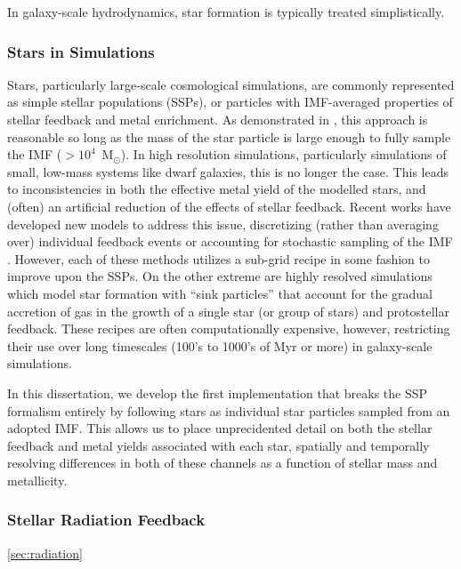 In galaxy-scale hydrodynamics, star formation is typically treated simplistically.


\subsubsection{Stars in Simulations}

Stars, particularly large-scale cosmological simulations, are commonly represented as simple stellar populations (SSPs), or particles with IMF-averaged properties of stellar feedback and metal enrichment. As demonstrated in \cite{Revaz2016}, this approach is reasonable so long as the mass of the star particle is large enough to fully sample the IMF ($> 10^{4}$~M$_{\odot}$). In high resolution simulations, particularly simulations of small, low-mass systems like dwarf galaxies, this is no longer the case. This leads to inconsistencies in both the effective metal yield of the modelled stars, and (often) an artificial reduction of the effects of stellar feedback. Recent works have developed new models to address this issue, discretizing (rather than averaging over) individual feedback events \citep[e.g.][]{Stinson2010,Hopkins2014,Hopkins2018,Rosdahl2018} or accounting for stochastic sampling of the IMF \citep{Hu2016,Hu2017,Applebaum2018,Su2018}. However, each of these methods utilizes a sub-grid recipe in some fashion to improve upon the SSPs. On the other extreme are highly resolved simulations which model star formation with ``sink particles'' \citep[see for example ][]{Krumholz2004,Federrath2010,GongOstriker2013,BleulerTeyssier2014,Sormani2017} that account for the gradual accretion of gas in the growth of a single star (or group of stars) and protostellar feedback. These recipes are often computationally expensive, however, restricting their use over long timescales (100's to 1000's of Myr or more) in galaxy-scale simulations.

In this dissertation, we develop the first implementation that breaks the SSP formalism entirely by following stars as individual star particles sampled from an adopted IMF. This allows us to place unprecidented detail on both the stellar feedback and metal yields associated with each star, spatially and temporally resolving differences in both of these channels as a function of stellar mass and metallicity.

\subsubsection{Stellar Radiation Feedback}
\ref{sec:radiation}



